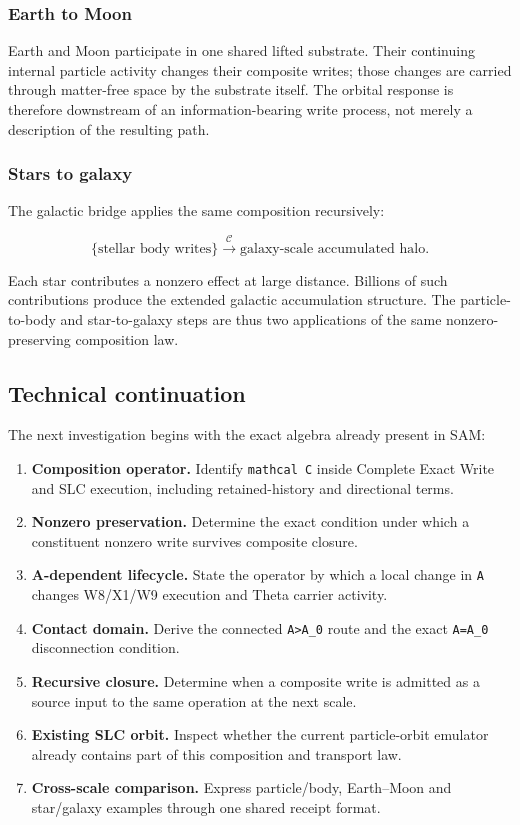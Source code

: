 \subsubsection{Earth to Moon}\label{viii-ch12-earth-to-moon}

Earth and Moon participate in one shared lifted substrate. Their
continuing internal particle activity changes their composite writes;
those changes are carried through matter-free space by the substrate
itself. The orbital response is therefore downstream of an
information-bearing write process, not merely a description of the
resulting path.

\subsubsection{Stars to galaxy}\label{viii-ch12-stars-to-galaxy}

The galactic bridge applies the same composition recursively:

\[
\{\text{stellar body writes}\}
\xrightarrow{\mathcal C}
\text{galaxy-scale accumulated halo}.
\]

Each star contributes a nonzero effect at large distance. Billions of
such contributions produce the extended galactic accumulation structure.
The particle-to-body and star-to-galaxy steps are thus two applications
of the same nonzero-preserving composition law.

\subsection{Technical continuation}\label{viii-ch12-technical-continuation}

The next investigation begins with the exact algebra already present in
SAM:

\begin{enumerate}
\def\labelenumi{\arabic{enumi}.}
\tightlist
\item
  \textbf{Composition operator.} Identify \texttt{mathcal\ C} inside
  Complete Exact Write and SLC execution, including retained-history and
  directional terms.
\item
  \textbf{Nonzero preservation.} Determine the exact condition under
  which a constituent nonzero write survives composite closure.
\item
  \textbf{A-dependent lifecycle.} State the operator by which a local
  change in \texttt{A} changes W8/X1/W9 execution and Theta carrier
  activity.
\item
  \textbf{Contact domain.} Derive the connected
  \texttt{A\textgreater{}A\_0} route and the exact \texttt{A=A\_0}
  disconnection condition.
\item
  \textbf{Recursive closure.} Determine when a composite write is
  admitted as a source input to the same operation at the next scale.
\item
  \textbf{Existing SLC orbit.} Inspect whether the current
  particle-orbit emulator already contains part of this composition and
  transport law.
\item
  \textbf{Cross-scale comparison.} Express particle/body, Earth--Moon
  and star/galaxy examples through one shared receipt format.
\end{enumerate}

